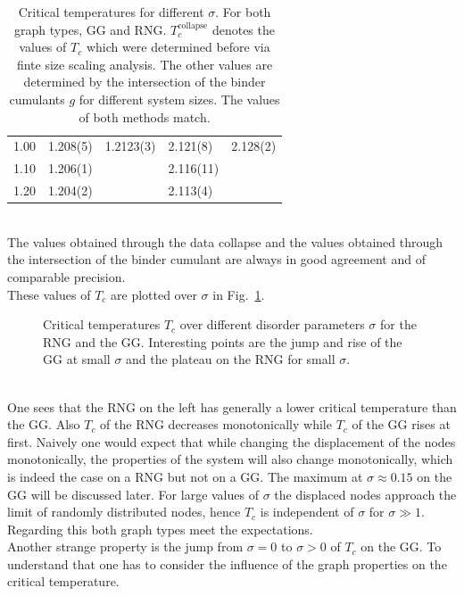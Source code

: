 \begin{table}[htbp]
\begin{tabular}{l l l l l}
            1.00 & 1.208(5) & 1.2123(3)& 2.121(8) & 2.128(2)\\
            1.10 & 1.206(1) &          & 2.116(11)&         \\
            1.20 & 1.204(2) &          & 2.113(4) &         \\
            \bottomrule
        \end{tabular}
        \caption[Critical Temperatures for Different $\sigma$]{
            Critical temperatures for different $\sigma$. For both graph
            types, GG and RNG. \(T_c^{\mathrm{collapse}}\) denotes the
            values of \(T_c\) which were determined before via finte
            size scaling analysis. The other values are determined by
            the intersection of the binder cumulants \(g\) for different
            system sizes. The values of both methods match.
        }
        \label{tab:critTemp}
    \end{table}\\
    The values obtained through the data collapse and the values obtained
    through the intersection of the binder cumulant are always in good
    agreement and of comparable precision.\\
    These values of \(T_c\) are plotted over \(\sigma\) in Fig.\ \ref{fig:Tc}.
    \begin{figure}[htbp]
        \centering
        \caption[Critical Temperature over Different Disorder Parameters]
        {
            Critical temperatures \(T_c\) over different
            disorder parameters \(\sigma\) for
             the RNG and
             the GG.
            Interesting points are the jump and rise of the GG at small
            \(\sigma\) and the plateau on the RNG for small \(\sigma\).
        }
        \label{fig:Tc}
    \end{figure}\\
    One sees that the RNG on the left has generally a lower critical
    temperature than the GG.
    Also \(T_c\) of the RNG decreases
    monotonically while \(T_c\) of the GG rises at first. Naively one would
    expect that while changing the displacement of the nodes monotonically,
    the properties of the system will also change monotonically, which is
    indeed the case on a RNG but not on a GG. The
    maximum at \(\sigma \approx 0.15\) on the GG will be discussed later.
    For large values of \(\sigma\) the displaced nodes approach the limit of randomly
    distributed nodes, hence \(T_c\) is independent of \(\sigma\) for
    \(\sigma \gg 1\). Regarding this both graph types meet the expectations.\\
    Another strange property is the jump from \(\sigma = 0\) to \(\sigma > 0\)
    of \(T_c\) on the GG. To understand that one has to
    consider the influence of the graph properties on the critical
    temperature.

